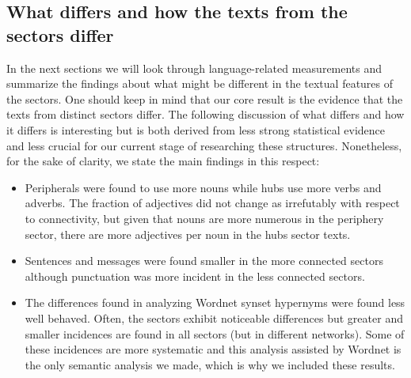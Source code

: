 \documentclass[review]{elsarticle}
\begin{document}
\subsection{What differs and how the texts from the sectors differ}
 In the next sections we will look through language-related measurements
 and summarize the findings about what might be different in
 the textual features of the sectors.
 One should keep in mind that our core result is the evidence that
 the texts from distinct sectors differ.
 The following discussion of what differs and how it differs
 is interesting but is both derived from less strong statistical evidence and less crucial for our current stage of researching these structures.
 Nonetheless, for the sake of clarity, we state the main findings in this respect:
 \begin{itemize}
\item Peripherals were found to use more nouns while hubs use more verbs and adverbs. The fraction of adjectives did not change as irrefutably with respect to connectivity, but given that nouns are more numerous in the periphery sector, there are more adjectives per noun in the hubs sector texts.
\item Sentences and messages were found smaller in the more connected sectors although punctuation was more incident in the less connected sectors.
\item The differences found in analyzing Wordnet synset hypernyms were found less well behaved. Often, the sectors exhibit noticeable differences but greater and smaller incidences are found in all sectors (but in different networks). Some of these incidences are more systematic and this analysis assisted by Wordnet is the only semantic analysis we made, which is why we included these results.
\end{itemize}
\end{document}
